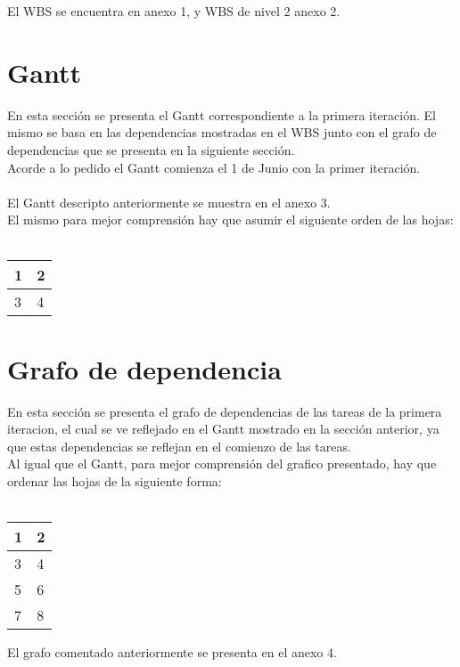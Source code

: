 \documentclass[a4paper, 11pt]{article}
\begin{document}
\bigskip
El WBS se encuentra en anexo 1, y WBS de nivel 2 anexo 2.

\section{Gantt}
En esta secci\'on se presenta el Gantt correspondiente a la primera iteraci\'on. El mismo se basa en las dependencias mostradas en el WBS junto con el grafo de dependencias que se presenta en la siguiente secci\'on.\\
Acorde a lo pedido el Gantt comienza el 1 de Junio con la primer iteraci\'on.\\
\\
El Gantt descripto anteriormente se muestra en el anexo 3.
\\
El mismo para mejor comprensi\'on hay que asumir el siguiente orden de las hojas:\\
\\
\begin{center}
\begin{tabular}{| p{3cm} | p{3cm} |}
\hline
1 & 2 \\ \hline
3 & 4 \\ \hline
\end{tabular}
\end{center}

\section{Grafo de dependencia}
En esta secci\'on se presenta el grafo de dependencias de las tareas de la primera iteracion, el cual se ve reflejado en el Gantt mostrado en la secci\'on anterior, ya que estas dependencias se reflejan en el comienzo de las tareas.\\
Al igual que el Gantt, para mejor comprensi\'on del grafico presentado, hay que ordenar las hojas de la siguiente forma:\\
\\
\begin{center}
\begin{tabular}{| p{3cm} | p{3cm} |}
\hline
1 & 2 \\ \hline
3 & 4 \\ \hline
5 & 6 \\ \hline
7 & 8 \\ \hline
\end{tabular}
\end{center}

El grafo comentado anteriormente se presenta en el anexo 4.
\end{document}
